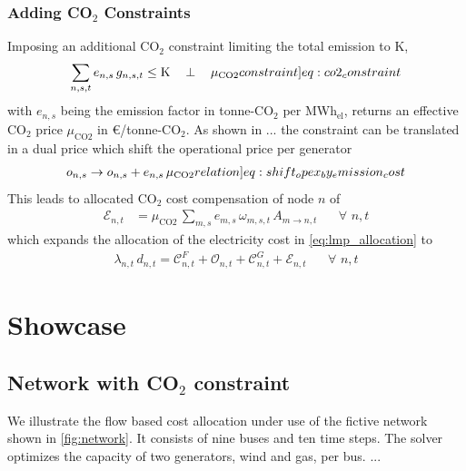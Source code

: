 \documentclass[11pt]{article}
\newcommand{\generation}[1][n]{g_{#1,s,t}}
\newcommand{\generationshare}[1][n]{\omega_{#1,s,t}}
\newcommand{\capacityGeneration}{G_{n,s}}
\newcommand{\capexGeneration}{c_{n,s}}
\newcommand{\opexGeneration}[1][n]{o_{#1,s}}
\newcommand{\demandnodal}[1][n]{d_{#1,t}}
\newcommand{\lmp}[1][n]{\lambda_{#1,t}}
\newcommand{\allocatePeer}[1][m \rightarrow n]{A_{#1,t}}
\newcommand{\allocateCapexGeneration}[1][n]{\mathcal{C}^{G}_{#1,t}}
\newcommand{\allocateCapexFlow}[1][n]{\mathcal{C}^{F}_{#1,t}}
\newcommand{\allocateOpex}[1][n]{\mathcal{O}_{#1,t}}
\newcommand{\allocateEmissionCost}[1][n]{\mathcal{E}_{#1,t}}
\newcommand{\emission}[1][n]{e_{#1,s}}
\newcommand{\emissionPrice}{\mu_{\text{CO2}}}
\newcommand{\megawatthour}{MWh$_\text{el}$}
\newcommand{\resultsin}[1]{\hspace{12pt} \bot  \hspace{12pt} #1}
\newcommand{\Forall}[1]{\hspace{20pt} \forall \,\, #1 }
\begin{document}
\subsubsection*{Adding CO$_2$ Constraints}

Imposing an additional CO$_2$ constraint limiting the total emission to K,  
\begin{align}
 \sum_{n,s,t} \emission \, \generation \le \text{K} \resultsin{\emissionPrice} 
 \label[constraint]{eq:co2_constraint}
\end{align}
with $\emission$ being the emission factor in tonne-CO$_2$ per \megawatthour, returns an effective CO$_2$ price $\emissionPrice$ in \euro/tonne-CO$_2$. 
% 
As shown in ... the constraint can be translated in a dual price which shift the operational price per generator
\begin{align}
\opexGeneration \rightarrow \opexGeneration + \emission \, \emissionPrice \label[relation]{eq:shift_opex_by_emission_cost}
\end{align}
This leads to allocated CO$_2$ cost compensation of node $n$ of
 \begin{align}
 \allocateEmissionCost &= \emissionPrice \, \sum_{m,s} \emission[m] \, \generationshare[m] \, \allocatePeer \Forall{n,t} \label{eq:allocate_emissionPrice}
\end{align}
which expands the allocation of the electricity cost in \cref{eq:lmp_allocation} to 
\begin{align}
 \lmp \, \demandnodal = \allocateCapexFlow + \allocateOpex + \allocateCapexGeneration  + \allocateEmissionCost \Forall{n,t}
 \label{eq:lmp_allocation_with_emission}
\end{align}


\newpage
\section*{Showcase}

\subsection*{Network with CO$_2$ constraint}
We illustrate the flow based cost allocation under use of the fictive network shown in \cref{fig:network}. It consists of nine buses and ten time steps. The solver optimizes the capacity of two generators, wind and gas, per bus. ...   
\end{document}
